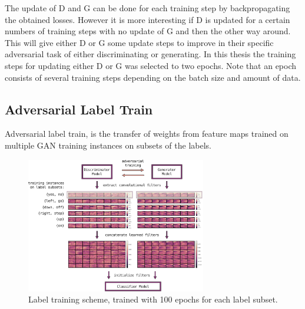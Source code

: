 The update of D and G can be done for each training step by backpropagating the obtained losses.
However it is more interesting if D is updated for a certain numbers of training steps with no update of G and then the other way around.
This will give either D or G some update steps to improve in their specific adversarial task of either discriminating or generating.
In this thesis the training steps for updating either D or G was selected to two epochs.
Note that an epoch consists of several training steps depending on the batch size and amount of data.



\subsection{Adversarial Label Train}
Adversarial label train, is the transfer of weights from feature maps trained on multiple GAN training instances on subsets of the labels.

\begin{figure}[!ht]
  \centering
    \includegraphics[width=0.7\textwidth]{./4_nn/figs/nn_adv_label_scheme}
  \caption{Label training scheme, trained with 100 epochs for each label subset.}
  \label{fig:nn_adv_label_scheme}
\end{figure}
\FloatBarrier
\noindent


